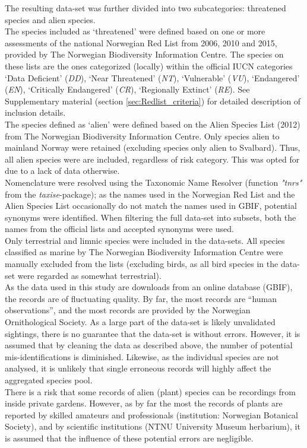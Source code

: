 \documentclass{article}
\begin{document}
The resulting data-set was further divided into two subcategories: threatened species and alien species.\\
The species included as `threatened' were defined based on one or more assessments of the national Norwegian Red List from 2006, 2010 and 2015, provided by The Norwegian Biodiversity Information Centre. The species on these lists are the ones categorized (locally) within the official IUCN categories `Data Deficient' (\textit{DD}),  `Near Threatened' (\textit{NT}), `Vulnerable' (\textit{VU}), `Endangered' (\textit{EN}), `Critically Endangered' (\textit{CR}), `Regionally Extinct' (\textit{RE}). See Supplementary material (section \ref{sec:Redlist_criteria}) for detailed description of inclusion details.\\
The species defined as `alien' were defined based on the Alien Species List (2012) from The Norwegian Biodiversity Information Centre. Only species alien to mainland Norway were retained (excluding species only alien to Svalbard). Thus, all alien species were are included, regardless of risk category. This was opted for due to a lack of data otherwise.\\
Nomenclature were resolved using the Taxonomic Name Resolver (function \textit{"tnrs"} from the \textit{taxise}-package); as the names used in the Norwegian Red List and the Alien Species List occasionally do not match the names used in GBIF, potential synonyms were identified. When filtering the full data-set into subsets, both the names from the official lists and accepted synonyms were used.\\
Only terrestrial and limnic species were included in the data-sets. All species classified as marine by The Norwegian Biodiversity Information Centre were manually excluded from the lists (excluding birds, as all bird species in the data-set were regarded as somewhat terrestrial).\\

As the data used in this study are downloads from an online database (GBIF), the records are of fluctuating quality. By far, the most records are ``human observations'', and the most records are provided by the Norwegian Ornithological Society. As a large part of the data-set is likely unvalidated sightings, there is no guarantee that the data-set is without errors. However, it is assumed that by cleaning the data as described above, the number of potential mis-identifications is diminished. Likewise, as the individual species are not analysed, it is unlikely that single erroneous records will highly affect the aggregated species pool.\\
There is a risk that some records of alien (plant) species can be recordings from inside private gardens. However, as by far the most the records of plants are reported by skilled amateurs and professionals (institution: Norwegian Botanical Society), and by scientific institutions (NTNU University Museum herbarium), it is assumed that the influence of these potential errors are negligible.\\
\end{document}
